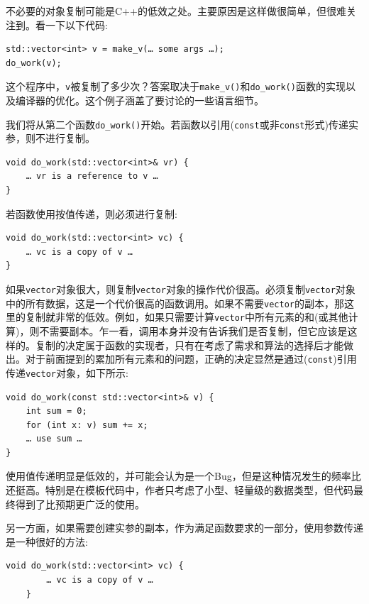 不必要的对象复制可能是C++的低效之处。主要原因是这样做很简单，但很难关注到。看一下以下代码:

\begin{lstlisting}[style=styleCXX]
std::vector<int> v = make_v(… some args …);
do_work(v);
\end{lstlisting}

这个程序中，\texttt{v}被复制了多少次？答案取决于\texttt{make\_v()}和\texttt{do\_work()}函数的实现以及编译器的优化。这个例子涵盖了要讨论的一些语言细节。


我们将从第二个函数\texttt{do\_work()}开始。若函数以引用(\texttt{const}或非\texttt{const}形式)传递实参，则不进行复制。

\begin{lstlisting}[style=styleCXX]
void do_work(std::vector<int>& vr) {
	… vr is a reference to v …
}
\end{lstlisting}

若函数使用按值传递，则必须进行复制:

\begin{lstlisting}[style=styleCXX]
void do_work(std::vector<int> vc) {
	… vc is a copy of v …
}
\end{lstlisting}

如果\texttt{vector}对象很大，则复制\texttt{vector}对象的操作代价很高。必须复制\texttt{vector}对象中的所有数据，这是一个代价很高的函数调用。如果不需要\texttt{vector}的副本，那这里的复制就非常的低效。例如，如果只需要计算\texttt{vector}中所有元素的和(或其他计算)，则不需要副本。乍一看，调用本身并没有告诉我们是否复制，但它应该是这样的。复制的决定属于函数的实现者，只有在考虑了需求和算法的选择后才能做出。对于前面提到的累加所有元素和的问题，正确的决定显然是通过(\texttt{const})引用传递\texttt{vector}对象，如下所示:

\begin{lstlisting}[style=styleCXX]
void do_work(const std::vector<int>& v) {
	int sum = 0;
	for (int x: v) sum += x;
	… use sum … 
}
\end{lstlisting}

使用值传递明显是低效的，并可能会认为是一个Bug，但是这种情况发生的频率比还挺高。特别是在模板代码中，作者只考虑了小型、轻量级的数据类型，但代码最终得到了比预期更广泛的使用。

另一方面，如果需要创建实参的副本，作为满足函数要求的一部分，使用参数传递是一种很好的方法:

\begin{lstlisting}[style=styleCXX]
	void do_work(std::vector<int> vc) {
		… vc is a copy of v …
	}
\end{lstlisting}

